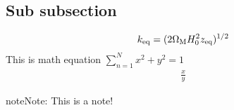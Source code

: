 \documentclass[letterpaper,10pt,english]{sphinxmanual}
\begin{document}
\subsection{Sub subsection}
\label{\detokenize{LinearAlgebra/Introduction:sub-subsection}}\label{\detokenize{LinearAlgebra/Introduction:introductioncode}}\begin{equation*}
\begin{split}k_{\rm eq} = (2 \Omega_{\rm M} H_0^2 z_{\rm eq})^{1/2}\end{split}
\end{equation*}
\sphinxAtStartPar
This is math equation \(\sum_{n=1}^{N} x^{2} + y^{2} = 1\)
\begin{equation*}
\begin{split}\frac{x}{y}\end{split}
\end{equation*}
\begin{sphinxVerbatim}[commandchars=\\\{\}]
   
\end{sphinxVerbatim}

\begin{sphinxadmonition}{note}{Note:}
\sphinxAtStartPar
This is a note!
\end{sphinxadmonition}
\end{document}
